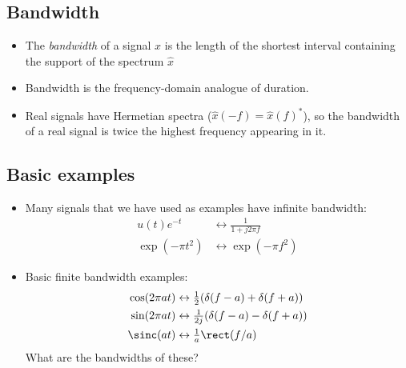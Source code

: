 \documentclass{ximera}
\begin{document}
\subsection{Bandwidth}
  \begin{itemize}
  \item The \emph{bandwidth} of a signal $x$ is the length of the shortest interval containing the support of the spectrum $\hat{x}$
  \item Bandwidth is the frequency-domain analogue of duration.
  \item Real signals have Hermetian spectra ($\hat{x}(-f) = \hat{x}(f)^*$), so the bandwidth of a real signal is twice the highest frequency appearing in it.
  \end{itemize}
  \vspace{2cm}


\subsection{Basic examples}
  \begin{itemize}
  \item Many signals that we have used as examples have infinite bandwidth:
    \begin{align*}
          u(t)e^{-t} &\leftrightarrow \frac{1}{1+j 2 \pi f}\\
    \exp(-\pi t^2) &\leftrightarrow \exp(-\pi f^2)
    \end{align*}
  \item Basic finite bandwidth examples:
    \begin{align*}
      \cos(2\pi a t) &\leftrightarrow \tfrac{1}{2}(\delta(f-a)+\delta(f+a))\\
      \sin(2\pi a t) &\leftrightarrow \tfrac{1}{2j}(\delta(f-a)-\delta(f+a))\\
      \sinc(at) &\leftrightarrow \tfrac{1}{a}\rect(f/a)
    \end{align*}
    What are the bandwidths of these?
    \vspace{3cm}
  \end{itemize}
\end{document}
